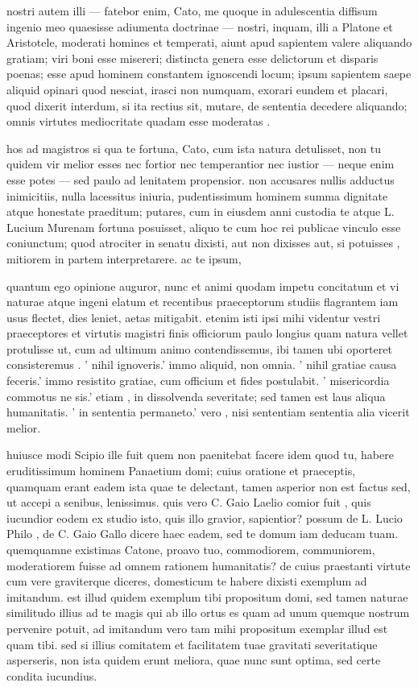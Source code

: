  nostri autem illi — fatebor enim, Cato, me quoque in adulescentia diffisum ingenio meo quaesisse adiumenta doctrinae — nostri, inquam, illi a Platone et Aristotele, moderati homines et temperati, aiunt apud sapientem valere aliquando gratiam; viri boni esse misereri; distincta genera esse delictorum et disparis poenas; esse apud hominem constantem ignoscendi locum; ipsum sapientem saepe aliquid opinari quod nesciat, irasci non numquam, exorari eundem et placari, quod dixerit interdum, si ita rectius sit, mutare, de sententia decedere aliquando; omnis virtutes mediocritate quadam esse moderatas .

 hos ad magistros si qua te fortuna, Cato, cum ista natura detulisset, non tu quidem vir melior esses nec fortior nec temperantior nec iustior — neque enim esse potes — sed paulo ad lenitatem propensior. non accusares nullis adductus inimicitiis, nulla lacessitus iniuria, pudentissimum hominem summa dignitate atque honestate praeditum; putares, cum in eiusdem anni custodia te atque L. Lucium Murenam fortuna posuisset, aliquo te cum hoc rei publicae vinculo esse coniunctum; quod atrociter in senatu dixisti, aut non dixisses aut, si potuisses , mitiorem in partem interpretarere. ac te ipsum,

 quantum ego opinione auguror, nunc et animi quodam impetu concitatum et vi naturae atque ingeni elatum et recentibus praeceptorum studiis flagrantem iam usus flectet, dies leniet, aetas mitigabit. etenim isti ipsi mihi videntur vestri praeceptores et virtutis magistri finis officiorum paulo longius quam natura vellet protulisse ut, cum ad ultimum animo contendissemus, ibi tamen ubi oporteret consisteremus . ' nihil ignoveris.' immo aliquid, non omnia. ' nihil gratiae causa feceris.' immo resistito gratiae, cum officium et fides postulabit. ' misericordia commotus ne sis.' etiam , in dissolvenda severitate; sed tamen est laus aliqua humanitatis. ' in sententia permaneto.' vero , nisi sententiam sententia alia vicerit melior.

 huiusce modi Scipio ille fuit quem non paenitebat facere idem quod tu, habere eruditissimum hominem Panaetium domi; cuius oratione et praeceptis, quamquam erant eadem ista quae te delectant, tamen asperior non est factus sed, ut accepi a senibus, lenissimus. quis vero C. Gaio Laelio comior fuit , quis iucundior eodem ex studio isto, quis illo gravior, sapientior? possum de L. Lucio Philo , de C. Gaio Gallo dicere haec eadem, sed te domum iam deducam tuam. quemquamne existimas Catone, proavo tuo, commodiorem, communiorem, moderatiorem fuisse ad omnem rationem humanitatis? de cuius praestanti virtute cum vere graviterque diceres, domesticum te habere dixisti exemplum ad imitandum. est illud quidem exemplum tibi propositum domi, sed tamen naturae similitudo illius ad te magis qui ab illo ortus es quam ad unum quemque nostrum pervenire potuit, ad imitandum vero tam mihi propositum exemplar illud est quam tibi. sed si illius comitatem et facilitatem tuae gravitati severitatique asperseris, non ista quidem erunt meliora, quae nunc sunt optima, sed certe condita iucundius.

